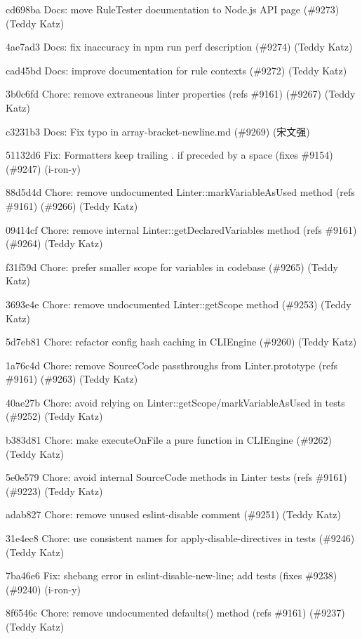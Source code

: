 \begin{DoxyItemize}
\item cd698ba Docs\+: move Rule\+Tester documentation to Node.\+js A\+PI page (\#9273) (Teddy Katz)
\item 4ae7ad3 Docs\+: fix inaccuracy in {\ttfamily npm run perf} description (\#9274) (Teddy Katz)
\item cad45bd Docs\+: improve documentation for rule contexts (\#9272) (Teddy Katz)
\item 3b0c6fd Chore\+: remove extraneous linter properties (refs \#9161) (\#9267) (Teddy Katz)
\item c3231b3 Docs\+: Fix typo in array-\/bracket-\/newline.\+md (\#9269) (宋文强)
\item 51132d6 Fix\+: Formatters keep trailing \textquotesingle{}.\textquotesingle{} if preceded by a space (fixes \#9154) (\#9247) (i-\/ron-\/y)
\item 88d5d4d Chore\+: remove undocumented Linter\+::mark\+Variable\+As\+Used method (refs \#9161) (\#9266) (Teddy Katz)
\item 09414cf Chore\+: remove internal Linter\+::get\+Declared\+Variables method (refs \#9161) (\#9264) (Teddy Katz)
\item f31f59d Chore\+: prefer smaller scope for variables in codebase (\#9265) (Teddy Katz)
\item 3693e4e Chore\+: remove undocumented Linter\+::get\+Scope method (\#9253) (Teddy Katz)
\item 5d7eb81 Chore\+: refactor config hash caching in C\+L\+I\+Engine (\#9260) (Teddy Katz)
\item 1a76c4d Chore\+: remove Source\+Code passthroughs from Linter.\+prototype (refs \#9161) (\#9263) (Teddy Katz)
\item 40ae27b Chore\+: avoid relying on Linter\+::get\+Scope/mark\+Variable\+As\+Used in tests (\#9252) (Teddy Katz)
\item b383d81 Chore\+: make execute\+On\+File a pure function in C\+L\+I\+Engine (\#9262) (Teddy Katz)
\item 5e0e579 Chore\+: avoid internal Source\+Code methods in Linter tests (refs \#9161) (\#9223) (Teddy Katz)
\item adab827 Chore\+: remove unused eslint-\/disable comment (\#9251) (Teddy Katz)
\item 31e4ec8 Chore\+: use consistent names for apply-\/disable-\/directives in tests (\#9246) (Teddy Katz)
\item 7ba46e6 Fix\+: shebang error in eslint-\/disable-\/new-\/line; add tests (fixes \#9238) (\#9240) (i-\/ron-\/y)
\item 8f6546c Chore\+: remove undocumented defaults() method (refs \#9161) (\#9237) (Teddy Katz)

\end{DoxyItemize}

